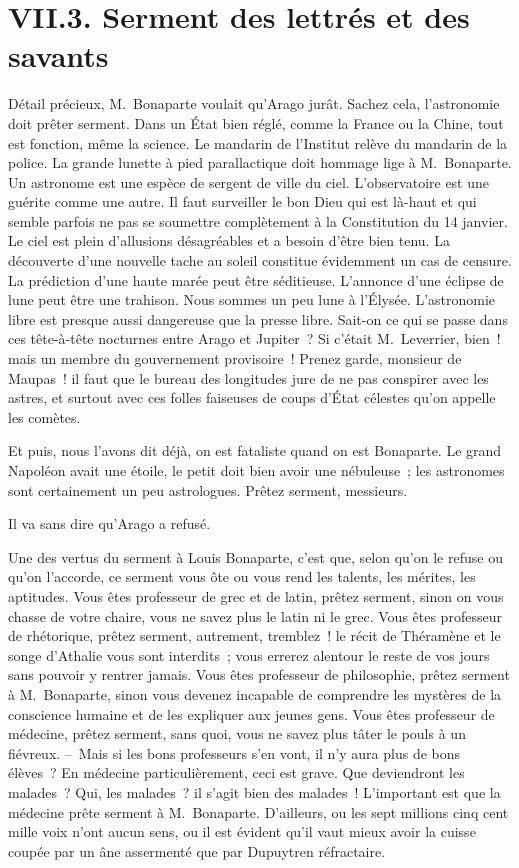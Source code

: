 \documentclass[french,twoside]{book} %
\begin{document}
\section[{VII.3. Serment des lettrés et des savants}]{VII.3. Serment des lettrés et des savants}

\noindent Détail précieux, M. Bonaparte voulait qu’Arago jurât. Sachez cela, l’astronomie doit prêter serment. Dans un État bien réglé, comme la France ou la Chine, tout est fonction, même la science. Le mandarin de l’Institut relève du mandarin de la police. La grande lunette à pied parallactique doit hommage lige à M. Bonaparte. Un astronome est une espèce de sergent de ville du ciel. L’observatoire est une guérite comme une autre. Il faut surveiller le bon Dieu qui est là-haut et qui semble parfois ne pas se soumettre complètement à la Constitution du 14 janvier. Le ciel est plein d’allusions désagréables et a besoin d’être bien tenu. La découverte d’une nouvelle tache au soleil constitue évidemment un cas de censure. La prédiction d’une haute marée peut être séditieuse. L’annonce d’une éclipse de lune peut être une trahison. Nous sommes un peu lune à l’Élysée. L’astronomie libre est presque aussi dangereuse que la presse libre. Sait-on ce qui se passe dans ces tête-à-tête nocturnes entre Arago et Jupiter ? Si c’était M. Leverrier, bien ! mais un membre du gouvernement provisoire ! Prenez garde, monsieur de Maupas ! il faut que le bureau des longitudes jure de ne pas conspirer avec les astres, et surtout avec ces folles faiseuses de coups d’État célestes qu’on appelle les comètes.\par
Et puis, nous l’avons dit déjà, on est fataliste quand on est Bonaparte. Le grand Napoléon avait une étoile, le petit doit bien avoir une nébuleuse ; les astronomes sont certainement un peu astrologues. Prêtez serment, messieurs.\par
Il va sans dire qu’Arago a refusé.\par
Une des vertus du serment à Louis Bonaparte, c’est que, selon qu’on le refuse ou qu’on l’accorde, ce serment vous ôte ou vous rend les talents, les mérites, les aptitudes. Vous êtes professeur de grec et de latin, prêtez serment, sinon on vous chasse de votre chaire, vous ne savez plus le latin ni le grec. Vous êtes professeur de rhétorique, prêtez serment, autrement, tremblez ! le récit de Théramène et le songe d’Athalie vous sont interdits ; vous errerez alentour le reste de vos jours sans pouvoir y rentrer jamais. Vous êtes professeur de philosophie, prêtez serment à M. Bonaparte, sinon vous devenez incapable de comprendre les mystères de la conscience humaine et de les expliquer aux jeunes gens. Vous êtes professeur de médecine, prêtez serment, sans quoi, vous ne savez plus tâter le pouls à un fiévreux. – Mais si les bons professeurs s’en vont, il n’y aura plus de bons élèves ? En médecine particulièrement, ceci est grave. Que deviendront les malades ? Qui, les malades ? il s’agit bien des malades ! L’important est que la médecine prête serment à M. Bonaparte. D’ailleurs, ou les sept millions cinq cent mille voix n’ont aucun sens, ou il est évident qu’il vaut mieux avoir la cuisse coupée par un âne assermenté que par Dupuytren réfractaire.\par
\end{document}
